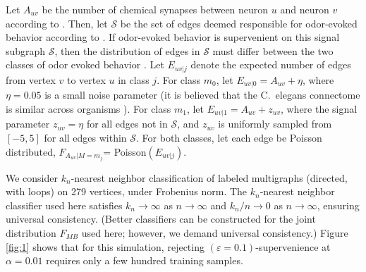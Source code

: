 \documentclass{article}
\newcommand{\eps}{\varepsilon}
\providecommand{\mc}[1]{\mathcal{#1}}
\begin{document}
Let $A_{uv}$ be the number of chemical synapses between neuron $u$ and neuron $v$ according to \cite{VarshneyChklovskii09}.  Then, let $\mc{S}$ be the set of edges deemed responsible for odor-evoked behavior according to \cite{ChalasaniBargmann07}.  If odor-evoked behavior is supervenient on this signal subgraph $\mc{S}$, then the distribution of edges in $\mc{S}$ must differ between the two classes of odor evoked behavior \cite{VP11_sigsub}.  Let $E_{uv|j}$ denote the expected number of edges from vertex $v$ to vertex $u$ in class $j$.   For class $m_0$, let $E_{uv|0}=A_{uv}+\eta$,  where $\eta=0.05$ is a small noise parameter  (it is believed that the C.~elegans connectome is similar across organisms \cite{Durbin87}). For class $m_1$, let $E_{uv|1}=A_{uv}+z_{uv}$, where the signal parameter $z_{uv}=\eta$ for all edges not in $\mc{S}$, and $z_{uv}$ is uniformly sampled from $[-5,5]$ for all edges within $\mc{S}$. For both classes, let each edge be Poisson distributed, $F_{A_{uv}|M=m_j}$= Poisson$(E_{uv|j})$.


We consider $k_n$-nearest neighbor classification of labeled multigraphs (directed, with loops) on 279 vertices, under Frobenius norm. The $k_n$-nearest neighbor classifier used here satisfies $k_n \rightarrow \infty$ as $n \rightarrow \infty$ and $k_n/n \rightarrow 0$ as $n \rightarrow \infty$, ensuring universal consistency. (Better classifiers can be constructed for the joint distribution $F_{MB}$ used here; however, we demand universal consistency.)  Figure \ref{fig:1} shows that for this simulation, rejecting $(\eps=0.1)$-supervenience at $\alpha=0.01$ requires only a few hundred training samples.


\end{document}
